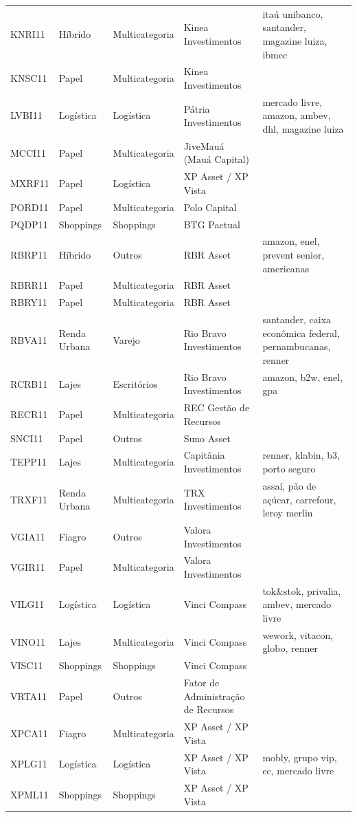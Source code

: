 \begin{tabular}{lllll}
KNRI11 & Híbrido & Multicategoria & Kinea Investimentos & itaú unibanco, santander, magazine luiza, ibmec \\
KNSC11 & Papel & Multicategoria & Kinea Investimentos &  \\
LVBI11 & Logística & Logística & Pátria Investimentos & mercado livre, amazon, ambev, dhl, magazine luiza \\
MCCI11 & Papel & Multicategoria & JiveMauá (Mauá Capital) &  \\
MXRF11 & Papel & Logística & XP Asset / XP Vista &  \\
PORD11 & Papel & Multicategoria & Polo Capital &  \\
PQDP11 & Shoppings & Shoppings & BTG Pactual &  \\
RBRP11 & Híbrido & Outros & RBR Asset & amazon, enel, prevent senior, americanas \\
RBRR11 & Papel & Multicategoria & RBR Asset &  \\
RBRY11 & Papel & Multicategoria & RBR Asset &  \\
RBVA11 & Renda Urbana & Varejo & Rio Bravo Investimentos & santander, caixa econômica federal, pernambucanas, renner \\
RCRB11 & Lajes & Escritórios & Rio Bravo Investimentos & amazon, b2w, enel, gpa \\
RECR11 & Papel & Multicategoria & REC Gestão de Recursos &  \\
SNCI11 & Papel & Outros & Suno Asset &  \\
TEPP11 & Lajes & Multicategoria & Capitânia Investimentos & renner, klabin, b3, porto seguro \\
TRXF11 & Renda Urbana & Multicategoria & TRX Investimentos & assaí, pão de açúcar, carrefour, leroy merlin \\
VGIA11 & Fiagro & Outros & Valora Investimentos &  \\
VGIR11 & Papel & Multicategoria & Valora Investimentos &  \\
VILG11 & Logística & Logística & Vinci Compass & tok\&stok, privalia, ambev, mercado livre \\
VINO11 & Lajes & Multicategoria & Vinci Compass & wework, vitacon, globo, renner \\
VISC11 & Shoppings & Shoppings & Vinci Compass &  \\
VRTA11 & Papel & Outros & Fator de Administração de Recursos &  \\
XPCA11 & Fiagro & Multicategoria & XP Asset / XP Vista &  \\
XPLG11 & Logística & Logística & XP Asset / XP Vista & mobly, grupo vip, ec, mercado livre \\
XPML11 & Shoppings & Shoppings & XP Asset / XP Vista &  \\
\bottomrule
\end{tabular}

